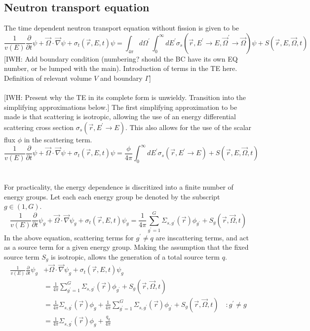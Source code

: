 \documentclass{article}
\newcommand{\vr}{\vec{r}}
\newcommand{\vO}{\vec{\Omega}}
\newcommand{\vgrad}{\vec{\nabla}}
\newcommand{\sigt}{\sigma_t}
\newcommand{\sigs}{\sigma_s}
\begin{document}
\subsection{Neutron transport equation}
The time dependent neutron transport equation without fission is given to be 
\begin{equation}
\frac{1}{v(E)} \frac{\partial}{\partial t}\psi + \vO \cdot \vgrad \psi + \sigt(\vr,E,t) \psi = \int_{4 \pi} d \Omega^\prime \, \int_0^\infty dE^\prime \sigs(\vr,E^\prime \to E, \vO^\prime \to \vO) \psi + S(\vr,E,\vO,t) 
\end{equation}
{\color{red}[IWH: Add boundary condition (numbering? should the BC have its own EQ number, or be lumped with the main). Introduction of terms in the TE here. Definition of relevant volume $V$ and boundary $\Gamma$]}
\\ \\
{\color{red}[IWH: Present why the TE in its complete form is unwieldy. Transition into the simplifying approximations below.]}
The first simplifying approximation to be made is that scattering is isotropic, allowing the use of an energy differential scattering cross section $\sigs(\vr,E^\prime \to E)$. This also allows for the use of the scalar flux $\phi$ in the scattering term.
\begin{equation}
\frac{1}{v(E)} \frac{\partial}{\partial t}\psi + \vO \cdot \vgrad \psi + \sigt(\vr,E,t) \psi = \frac{\phi}{4 \pi} \int_0^\infty dE^\prime \sigs(\vr,E^\prime \to E) + S(\vr,E,\vO,t) 
\end{equation}
 \\ \\
For practicality, the energy dependence is discritized into a finite number of energy groups. Let each each energy group be denoted by the subscript $g \in (1,G)$. 
\begin{equation}
\frac{1}{v(E)} \frac{\partial}{\partial t}\psi_g + \vO \cdot \vgrad \psi_g + \sigt(\vr,E,t) \psi_g = \frac{1}{4 \pi} \sum_{g^\prime=1}^G  \Sigma_{s,g^\prime}(\vr) \phi_{g^\prime} + S_g(\vr,\vO,t) 
\end{equation}
In the above equation, scattering terms for $g^\prime \neq q$ are inscattering terms, and act as a source term for a given energy group. Making the assumption that the fixed source term $S_g$ is isotropic, allows the generation of a total source term $q$.
\begin{equation}
\begin{split}
\frac{1}{v(E)} \frac{\partial}{\partial t}\psi_g &+ \vO \cdot \vgrad \psi_g + \sigt(\vr,E,t) \psi_g \\
&= \frac{1}{4 \pi} \sum_{g^\prime=1}^G  \Sigma_{s,g^\prime}(\vr) \phi_{g^\prime} + S_g(\vr,\vO,t) \\
&= \frac{1}{4 \pi} \Sigma_{s,g^\prime}(\vr) \phi_{g}
+ \frac{1}{4 \pi} \sum_{g^\prime=1}^G  \Sigma_{s,g^\prime}(\vr) \phi_{g^\prime} + S_g(\vr,\vO,t)  \quad :g^\prime \neq g\\
&= \frac{1}{4 \pi} \Sigma_{s,g^\prime}(\vr) \phi_{g}
+ \frac{q_g}{4 \pi}\
\end{split}
\end{equation}
\end{document}
